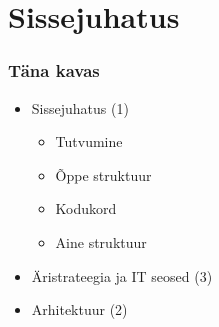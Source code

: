 


\maketitle

\section{Sissejuhatus}
\begin{frame}[fragile]
  \frametitle{Täna kavas}
\begin{itemize}
	\item Sissejuhatus (1)
	\begin{itemize}
		\item Tutvumine
		\item Õppe struktuur
		\item Kodukord
		\item Aine struktuur
	\end{itemize}
	\item Äristrateegia ja IT seosed (3)
	\item Arhitektuur (2)
\end{itemize}
	
\end{frame}

